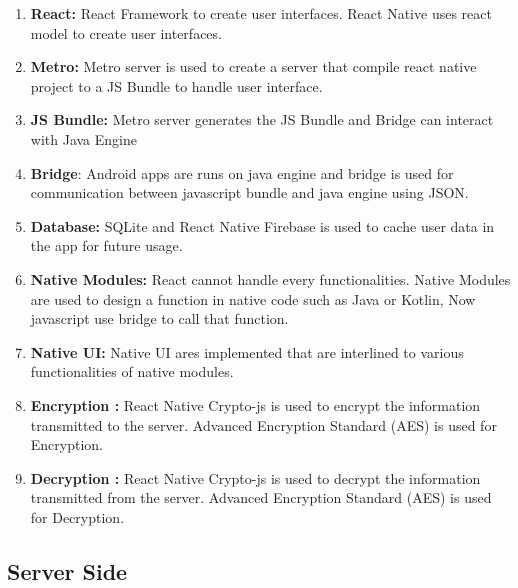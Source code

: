 \begin{enumerate}[label=\roman*.]

    \item \textbf{React:} React Framework to create user interfaces. React Native uses react model to create user interfaces.
    
    \item \textbf{Metro:} Metro server is used to create a server that compile react native project to a JS Bundle to handle user interface.
    
    \item \textbf{JS Bundle:} Metro server generates the JS Bundle and Bridge can interact with Java Engine

    \item \textbf{Bridge}: Android apps are runs on java engine and  bridge is used for communication between javascript bundle  and java engine  using JSON.
    
    \item \textbf{Database:} SQLite and React Native Firebase is used to cache user data in the app for future usage.
    
    \item \textbf{Native Modules:} React cannot handle every functionalities. Native Modules are used to  design a function in native code such as Java or Kotlin, Now javascript use bridge to call that function.
    
    \item \textbf{Native UI:} Native UI ares implemented that are interlined to various functionalities of native modules.
    
    \item \textbf{Encryption :} React Native Crypto-js is used to encrypt the information transmitted to the server. Advanced Encryption Standard (AES) is used for Encryption.
    
    \item \textbf{Decryption :} React Native Crypto-js is used to decrypt the information transmitted from the server. Advanced Encryption Standard (AES) is used for Decryption.

\end{enumerate}

\subsection{Server Side}

